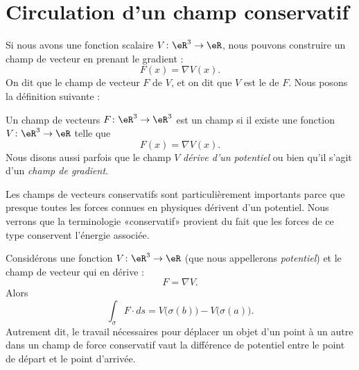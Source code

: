 \section{Circulation d'un champ conservatif}

Si nous avons une fonction scalaire \( V\colon \eR^3\to \eR\), nous pouvons construire un champ de vecteur en prenant le gradient :
\begin{equation}
	F(x)=\nabla V(x).
\end{equation}
On dit que le champ de vecteur \( F\)  de \( V\), et on dit que \( V\) est le  de \( F\). Nous posons la définition suivante :
\begin{definition}
	Un champ de vecteurs \( F\colon \eR^3\to \eR^3\) est un champ  si il existe une fonction \( V\colon \eR^3\to \eR\) telle que
	\begin{equation}
		F(x)=\nabla V(x).
	\end{equation}
	Nous disons aussi parfois que le champ \( V\) \emph{dérive d'un potentiel} ou bien qu'il s'agit d'un \emph{champ de gradient}.
\end{definition}

Les champs de vecteurs conservatifs sont particulièrement importants parce que presque toutes les forces connues en physiques dérivent d'un potentiel. Nous verrons que la terminologie «conservatif» provient du fait que les forces de ce type conservent l'énergie associée.


\begin{proposition}
	Considérons une fonction \( V\colon \eR^3\to \eR\) (que nous appellerons \emph{potentiel}) et le champ de vecteur qui en dérive :
	\begin{equation}
		F=\nabla V.
	\end{equation}
	Alors
	\begin{equation}
		\int_{\sigma}F\cdot ds=V\big( \sigma(b) \big)-V\big( \sigma(a) \big).
	\end{equation}
	Autrement dit, le travail nécessaires pour déplacer un objet d'un point à un autre dans un champ de force conservatif vaut la différence de potentiel entre le point de départ et le point d'arrivée.
\end{proposition}

